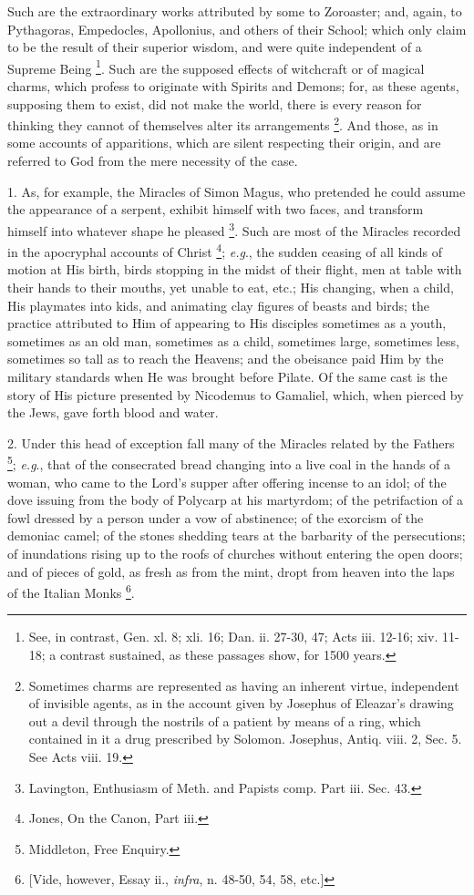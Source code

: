 Such are the extraordinary works attributed by
some to Zoroaster; and, again, to Pythagoras, Empedocles, Apollonius,
and others of their School; which only claim to be the result of their
superior wisdom, and were quite independent of a Supreme Being \footnote{See, in contrast, Gen. xl. 8; xli. 16; Dan.
ii. 27-30, 47; Acts iii. 12-16; xiv. 11-18; a contrast sustained, as
these passages show, for 1500 years.}. Such are the supposed effects of witchcraft or of magical charms,
which profess to originate with Spirits and Demons; for, as these
agents, supposing them to exist, did not make the world, there is
every reason for thinking they cannot of themselves alter its
arrangements \footnote{Sometimes charms are represented as having an
inherent virtue, independent of invisible agents, as in the account
given by Josephus of Eleazar's drawing out a devil through the
nostrils of a patient by means of a ring, which contained in it a drug
prescribed by Solomon. Josephus, Antiq. viii. 2, Sec. 5. See Acts
viii. 19.}. And those, as in some accounts of apparitions, which are silent respecting their origin, and are
referred to God from the mere necessity of the case.


1. As, for example, the Miracles of Simon Magus,
who pretended he could assume the appearance of a serpent, exhibit
himself with two faces, and transform himself into whatever shape he
pleased \footnote{Lavington, Enthusiasm of Meth. and Papists
comp. Part iii. Sec. 43.}. Such are most of the Miracles recorded in the
apocryphal accounts of Christ \footnote{Jones, On the Canon, Part iii.}; \emph{e.g}., the sudden
ceasing of all kinds of motion at His birth, birds stopping in the
midst of their flight, men at table with their hands to their mouths,
yet unable to eat, etc.; His changing, when a child, His playmates
into kids, and animating clay figures of beasts and birds; the
practice attributed to Him of appearing to His disciples sometimes as
a youth, sometimes as an old man, sometimes as a child, sometimes
large, sometimes less, sometimes so tall as to reach the Heavens; and
the obeisance paid Him by the military standards when He was brought
before Pilate. Of the same cast is the story of His picture presented
by Nicodemus to Gamaliel, which, when pierced by the Jews, gave forth
blood and water.

2. Under this head of exception fall many of the
Miracles related by the Fathers \footnote{Middleton, Free Enquiry.}; \emph{e.g}., that of the
consecrated bread changing into a live coal in the hands of a woman,
who came to the Lord's supper after offering incense to an idol; of
the dove issuing from the body of Polycarp at his martyrdom; of the
petrifaction of a fowl dressed by a person under a vow of abstinence;
of the exorcism of the demoniac camel; of the stones shedding tears at
the barbarity of the persecutions; of inundations rising up to the
roofs of churches without entering the open doors; and of pieces of
gold, as fresh as from the mint, dropt from heaven into the laps of
the Italian Monks \footnote{[Vide, however, Essay ii., \emph{infra}, n.
48-50, 54, 58, etc.]}.

